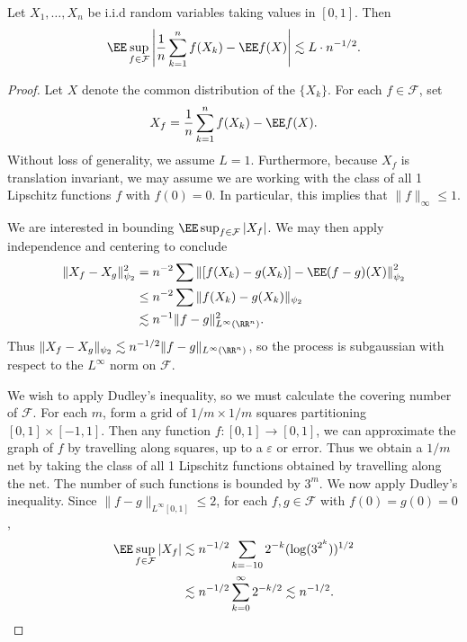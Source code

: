\begin{theorem}
	Let $X_1, \dots, X_n$ be i.i.d random variables taking values in $[0,1]$. Then
	\[ \EE \sup_{f \in \mathcal{F}} \left| \frac{1}{n} \sum_{k = 1}^n f(X_k) - \EE f(X) \right| \lesssim L \cdot n^{-1/2}. \]
\end{theorem}
\begin{proof}
	Let $X$ denote the common distribution of the $\{ X_k \}$. For each $f \in \mathcal{F}$, set
	\[ X_f = \frac{1}{n} \sum_{k = 1}^n f(X_k) - \EE f(X). \]
	Without loss of generality, we assume $L = 1$. Furthermore, because $X_f$ is translation invariant, we may assume we are working with the class of all 1 Lipschitz functions $f$ with $f(0) = 0$. In particular, this implies that $\| f \|_\infty \leq 1$.

	We are interested in bounding $\EE \sup_{f \in \mathcal{F}} |X_f|$. We may then apply independence and centering to conclude
	\begin{align*}
		\| X_f - X_g \|_{\psi_2}^2 &= n^{-2} \sum \left\| [f(X_k) - g(X_k)] - \EE (f - g)(X) \right\|_{\psi_2}^2\\
		&\leq n^{-2} \sum \| f(X_k) - g(X_k) \|_{\psi_2}\\
		&\lesssim n^{-1} \| f - g \|_{L^\infty(\RR^n)}^2.
	\end{align*}
	Thus $\| X_f - X_g \|_{\psi_2} \lesssim n^{-1/2} \| f - g \|_{L^\infty(\RR^n)}$, so the process is subgaussian with respect to the $L^\infty$ norm on $\mathcal{F}$.

	We wish to apply Dudley's inequality, so we must calculate the covering number of $\mathcal{F}$. For each $m$, form a grid of $1/m \times 1/m$ squares partitioning $[0,1] \times [-1,1]$. Then any function $f: [0,1] \to [0,1]$, we can approximate the graph of $f$ by travelling along squares, up to a $\varepsilon$ or error. Thus we obtain a $1/m$ net by taking the class of all 1 Lipschitz functions obtained by travelling along the net. The number of such functions is bounded by $3^m$. We now apply Dudley's inequality. Since $\| f - g \|_{L^\infty[0,1]} \leq 2$, for each $f,g \in \mathcal{F}$ with $f(0) = g(0) = 0$,
	\begin{align*}
		\EE \sup_{f \in \mathcal{F}} |X_f| &\lesssim n^{-1/2} \sum_{k = -10} 2^{-k} (\log(3^{2^k}))^{1/2}\\
		&\lesssim n^{-1/2} \sum_{k = 0}^\infty 2^{-k/2} \lesssim n^{-1/2}. \qedhere
	\end{align*}
\end{proof}

